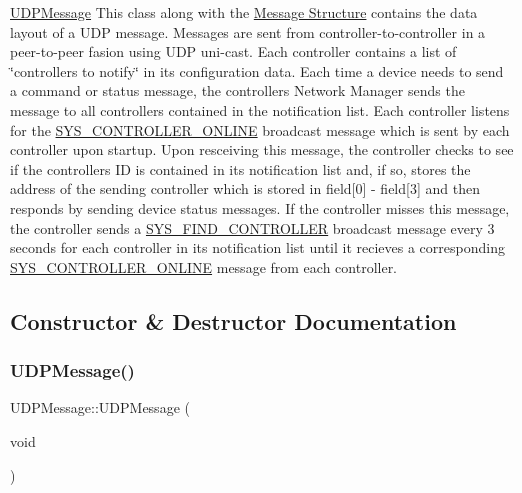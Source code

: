 \hyperlink{class_u_d_p_message}{U\+D\+P\+Message} This class along with the \hyperlink{struct_u_d_p_message_struct}{Message Structure} contains the data layout of a U\+DP message. Messages are sent from controller-\/to-\/controller in a peer-\/to-\/peer fasion using U\+DP uni-\/cast. Each controller contains a list of \char`\"{}controllers to notify\char`\"{} in its configuration data. Each time a device needs to send a command or status message, the controller\textquotesingle{}s Network Manager sends the message to all controllers contained in the notification list. Each controller listens for the \hyperlink{group___u_d_p_message_i_d_ga23aab89076591390a1dbc412a3a07314}{S\+Y\+S\+\_\+\+C\+O\+N\+T\+R\+O\+L\+L\+E\+R\+\_\+\+O\+N\+L\+I\+NE} broadcast message which is sent by each controller upon startup. Upon resceiving this message, the controller checks to see if the controller\textquotesingle{}s ID is contained in its notification list and, if so, stores the address of the sending controller which is stored in field\mbox{[}0\mbox{]} -\/ field\mbox{[}3\mbox{]} and then responds by sending device status messages. If the controller misses this message, the controller sends a \hyperlink{group___u_d_p_message_i_d_gadfda0e5a5a6a08de555dd55182a4cd87}{S\+Y\+S\+\_\+\+F\+I\+N\+D\+\_\+\+C\+O\+N\+T\+R\+O\+L\+L\+ER} broadcast message every 3 seconds for each controller in its notification list until it recieves a corresponding \hyperlink{group___u_d_p_message_i_d_ga23aab89076591390a1dbc412a3a07314}{S\+Y\+S\+\_\+\+C\+O\+N\+T\+R\+O\+L\+L\+E\+R\+\_\+\+O\+N\+L\+I\+NE} message from each controller. 

\subsection{Constructor \& Destructor Documentation}
\mbox{\label{class_u_d_p_message_a823351519fc5818ccc03030c6947e620}} 
\subsubsection{\texorpdfstring{U\+D\+P\+Message()}{UDPMessage()}\hspace{0.1cm}{\footnotesize\ttfamily [1/3]}}
{\footnotesize\ttfamily U\+D\+P\+Message\+::\+U\+D\+P\+Message (\begin{DoxyParamCaption}\item[{void}]{ }\end{DoxyParamCaption})}

